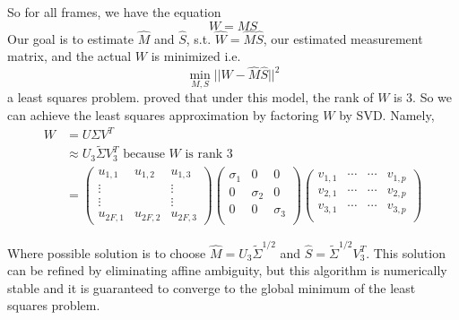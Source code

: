 \documentclass[a4paper]{article}
\begin{document}
So for all frames, we have the equation $$W = MS$$
Our goal is to estimate $\hat M$ and $\hat S$, s.t. $\hat W = \hat M
\hat S$, our estimated
measurement matrix, and the actual $W$ is minimized i.e. $$\min_{M,
  S}||W- \hat M \hat S||^2$$
a least squares problem.
\cite{Tomasi} proved that under this model, the rank of $W$ is 3. So
we can achieve the least squares approximation by factoring $W$ by
SVD. Namely, 
\begin{align*}
W &= U\Sigma V^T\\
&\approx U_3\tilde \Sigma V_3^T \text{ because $W$ is rank 3}\\
&=
\begin{pmatrix}
  u_{1,1} & u_{1,2} & u_{1,3} \\ \vdots & & \vdots
\\ \vdots & & \vdots
\\   u_{2F,1} & u_{2F,2} & u_{2F,3} 
\end{pmatrix}
\begin{pmatrix}
  \sigma_1 & 0 & 0 \\
  0 & \sigma_2 & 0 \\
  0 & 0 & \sigma_3 \\
\end{pmatrix}
\begin{pmatrix}
  v_{1,1} &  \cdots &\cdots & v_{1,p}\\
  v_{2,1} &  \cdots &\cdots & v_{2,p}\\
  v_{3,1} &  \cdots &\cdots & v_{3,p}\\
\end{pmatrix}
\end{align*}

Where possible solution is to choose $\hat M = U_3\tilde \Sigma^{1/2}$
and $\hat S =\tilde \Sigma^{1/2}V_3^T$. This solution can be refined
by eliminating affine ambiguity, but this algorithm is numerically
stable and it is guaranteed to converge to the global minimum of the
least squares problem.


\end{document}
